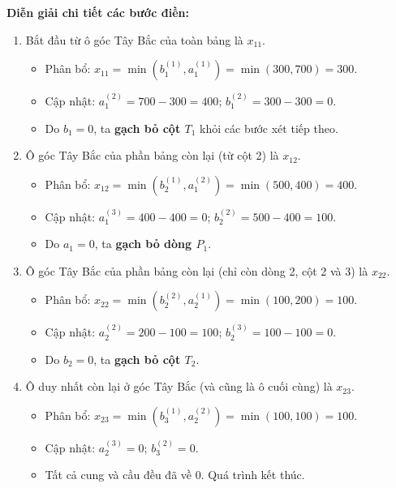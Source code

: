 \textbf{Diễn giải chi tiết các bước điền:}
\begin{enumerate}
    \item Bắt đầu từ ô góc Tây Bắc của toàn bảng là $x_{11}$.
    \begin{itemize}
        \item Phân bổ: $x_{11} = \min(b_1^{(1)}, a_1^{(1)}) = \min(300, 700) = 300$.
        \item Cập nhật: $a_1^{(2)} = 700 - 300 = 400$; $b_1^{(2)} = 300 - 300 = 0$.
        \item Do $b_1 = 0$, ta \textbf{gạch bỏ cột $T_1$} khỏi các bước xét tiếp theo.
    \end{itemize}
    
    \item Ô góc Tây Bắc của phần bảng còn lại (từ cột 2) là $x_{12}$.
    \begin{itemize}
        \item Phân bổ: $x_{12} = \min(b_2^{(1)}, a_1^{(2)}) = \min(500, 400) = 400$.
        \item Cập nhật: $a_1^{(3)} = 400 - 400 = 0$; $b_2^{(2)} = 500 - 400 = 100$.
        \item Do $a_1 = 0$, ta \textbf{gạch bỏ dòng $P_1$}.
    \end{itemize}
    
    \item Ô góc Tây Bắc của phần bảng còn lại (chỉ còn dòng 2, cột 2 và 3) là $x_{22}$.
    \begin{itemize}
        \item Phân bổ: $x_{22} = \min(b_2^{(2)}, a_2^{(1)}) = \min(100, 200) = 100$.
        \item Cập nhật: $a_2^{(2)} = 200 - 100 = 100$; $b_2^{(3)} = 100 - 100 = 0$.
        \item Do $b_2 = 0$, ta \textbf{gạch bỏ cột $T_2$}.
    \end{itemize}
    
    \item Ô duy nhất còn lại ở góc Tây Bắc (và cũng là ô cuối cùng) là $x_{23}$.
    \begin{itemize}
        \item Phân bổ: $x_{23} = \min(b_3^{(1)}, a_2^{(2)}) = \min(100, 100) = 100$.
        \item Cập nhật: $a_2^{(3)} = 0$; $b_3^{(2)} = 0$.
        \item Tất cả cung và cầu đều đã về 0. Quá trình kết thúc.
    \end{itemize}
\end{enumerate}

